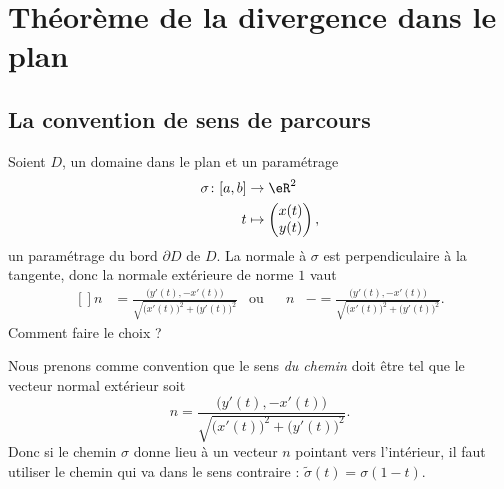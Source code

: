\section{Théorème de la divergence dans le plan}

\subsection{La convention de sens de parcours}

Soient $D$, un domaine dans le plan et un paramétrage
\begin{equation}
	\begin{aligned}
		\sigma\colon \mathopen[ a , b \mathclose] & \to \eR^2                           \\
		t                                         & \mapsto \begin{pmatrix}
			x(t) \\
			y(t)
		\end{pmatrix},
	\end{aligned}
\end{equation}
un paramétrage du bord $\partial D$ de $D$. La normale à $\sigma$ est perpendiculaire à la tangente, donc la normale extérieure de norme $1$ vaut
\begin{equation}
	\begin{aligned}[]
		n & =\frac{ \big( y'(t),-x'(t) \big) }{ \sqrt{ \big( x'(t)\big)^2+\big( y'(t) \big)^2  } } & \text{ou} &  & n & -=\frac{ \big( y'(t),-x'(t) \big) }{ \sqrt{ \big( x'(t)\big)^2+\big( y'(t) \big)^2  } }.
	\end{aligned}
\end{equation}
Comment faire le choix ?

Nous prenons comme convention que le sens \emph{du chemin} doit être tel que le vecteur normal extérieur soit
\begin{equation}
	n=\frac{ \big( y'(t),-x'(t) \big) }{ \sqrt{ \big( x'(t)\big)^2+\big( y'(t) \big)^2  } }.
\end{equation}
Donc si le chemin $\sigma$ donne lieu à un vecteur $n$ pointant vers l'intérieur, il faut utiliser le chemin qui va dans le sens contraire : $\tilde \sigma(t)=\sigma(1-t)$.


